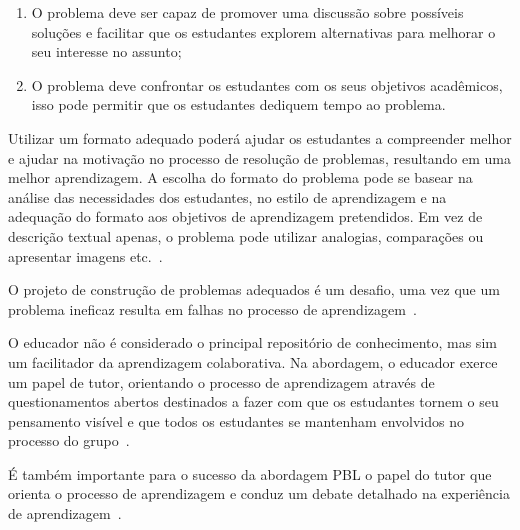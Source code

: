 \begin{enumerate}
{para não prejudicar os estudantes na
autoaprendizagem;}
\item{O problema deve ser capaz de promover uma discussão
sobre possíveis soluções e facilitar que os estudantes
explorem alternativas para melhorar o seu interesse
no assunto;}
\item{O problema deve confrontar os estudantes com
os seus objetivos acadêmicos, isso pode permitir
que os estudantes dediquem tempo ao problema.}
\end{enumerate}

Utilizar um formato adequado poderá ajudar os estudantes
a compreender melhor e ajudar na motivação no processo
de resolução de problemas, resultando em uma
melhor aprendizagem.
A escolha do formato do problema pode se basear na análise
das necessidades dos estudantes, no estilo de aprendizagem
e na adequação do formato aos objetivos de
aprendizagem pretendidos.
Em vez de descrição textual apenas, o problema pode
utilizar analogias, comparações ou apresentar imagens
etc.~\cite{sockalingam2011student}.

O projeto de construção de problemas adequados é um desafio, uma
vez que um problema ineficaz resulta em falhas no processo de
aprendizagem~\cite{azer2012twelve,amos1998problem,
des1999delphi,kukkamalla2011designing}.


O educador não é considerado o principal repositório
de conhecimento, mas sim um facilitador da aprendizagem
colaborativa.
Na abordagem, o educador exerce um papel de tutor, orientando
o processo de aprendizagem através de questionamentos abertos
destinados a fazer com que os estudantes tornem o seu pensamento
visível e que todos os estudantes se mantenham envolvidos
no processo do grupo~\cite{hmelo2004problem}.

É também importante para o sucesso da abordagem \ac{PBL} o
papel do tutor que orienta o processo de aprendizagem
e conduz um debate detalhado na experiência de
aprendizagem~\cite{savery2015overview}.

